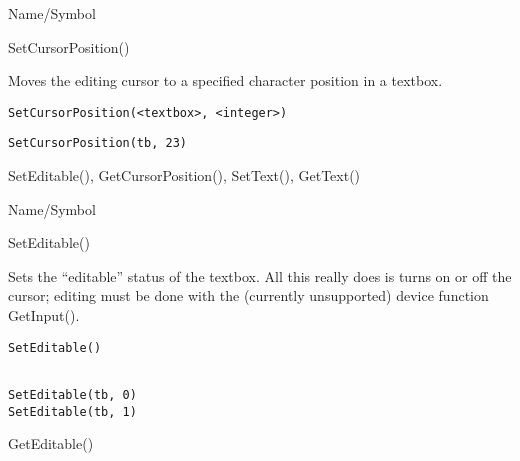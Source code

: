 \rl


\begin{desc}{Name/Symbol}
\item[Name/Symbol] 	SetCursorPosition()

\item[Description] 	Moves the editing cursor to a specified character
		position in a textbox.

\item[Usage]
\begin{verbatim}
SetCursorPosition(<textbox>, <integer>)
\end{verbatim}

\item[Example]
\begin{verbatim}
SetCursorPosition(tb, 23)
\end{verbatim}

\item[See Also]   	SetEditable(), GetCursorPosition(), SetText(), GetText()
\end{desc}

\rl


\begin{desc}{Name/Symbol}
\item[Name/Symbol] 	SetEditable()

\item[Description] 	Sets the ``editable'' status of the textbox.  All this really does is turns on or off the cursor; editing must be done with the (currently unsupported) device function GetInput().

\item[Usage] 
\begin{verbatim}
SetEditable()
\end{verbatim}

\item[Example]
\begin{verbatim}

SetEditable(tb, 0)
SetEditable(tb, 1)
\end{verbatim}

\item[See Also]    	GetEditable()
\end{desc}

\rl



